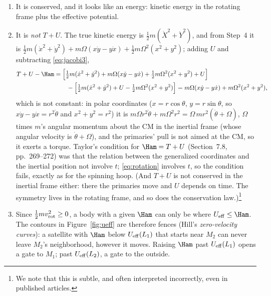 \documentclass[12pt]{article}
\numberwithin{equation}{section}
\newcommand{\Om}{\Omega}
\newcommand{\Ueff}{U_{\rm eff}}
\begin{document}
\begin{enumerate}
\item It is conserved, and it looks like an energy: kinetic energy in the rotating frame plus
  the effective potential.
\item It is \emph{not} $T + U$. The true kinetic energy is $\tfrac12 m(\dot X^2 + \dot Y^2)$,
  and from Step~4 it is $\tfrac12 m(\dot x^2 + \dot y^2) + m\Om(x\dot y - y\dot x)
  + \tfrac12 m\Om^2(x^2+y^2)$; adding $U$ and subtracting \eqref{eq:jacobi3},
  \begin{align}
    T + U - \Ham &= \Bigl[\tfrac12 m(\dot x^2 + \dot y^2) + m\Om(x\dot y - y\dot x)
      + \tfrac12 m\Om^2(x^2+y^2) + U\Bigr] \nonumber\\
    &\qquad - \Bigl[\tfrac12 m(\dot x^2 + \dot y^2) + U - \tfrac12 m\Om^2(x^2+y^2)\Bigr]
    = m\Om(x\dot y - y\dot x) + m\Om^2(x^2 + y^2),
  \end{align}
  which is not constant: in polar coordinates ($x = r\cos\theta$, $y = r\sin\theta$, so
  $x\dot y - y\dot x = r^2\dot\theta$ and $x^2 + y^2 = r^2$) it is
  $m\Om r^2\dot\theta + m\Om^2 r^2 = \Om\, m r^2(\dot\theta + \Om)$, $\Om$ times
  $m$'s angular momentum about the CM in the inertial frame (whose angular velocity is
  $\dot\theta + \Om$), and the primaries' pull is not aimed at the CM, so it exerts a torque. Taylor's condition for $\Ham = T + U$ (Section~7.8, pp.~269--272) was that the relation between
  the generalized coordinates and the inertial position not involve $t$; \eqref{eq:rotation}
  involves $t$, so the condition fails, exactly as for the spinning hoop. (And $T + U$ is not
  conserved in the inertial frame either: there the primaries move and $U$ depends on time.
  The symmetry lives in the rotating frame, and so does the conservation
  law.)\footnote{We note that this is subtle, and often interpreted incorrectly, even in
    published articles.}
\item Since $\tfrac12 m v_{\rm rot}^2 \geq 0$, a body with a given $\Ham$ can only be where
  $\Ueff \leq \Ham$. The contours in Figure~\ref{fig:ueff} are therefore fences (Hill's
  \emph{zero-velocity curves}): a satellite with $\Ham$ below $\Ueff(L_1)$ that starts near
  $M_2$ can never leave $M_2$'s neighborhood, however it moves. Raising $\Ham$ past
  $\Ueff(L_1)$ opens a gate to $M_1$; past $\Ueff(L_2)$, a gate to the outside.
\end{enumerate}
\end{document}
